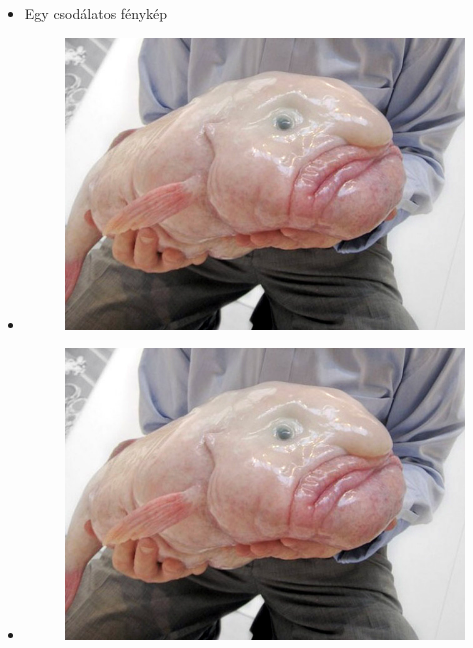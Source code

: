 \documentclass[aspectratio=169,12pt]{beamer}
\begin{document}
\begin{frame}
\end{frame}

\begin{frame}
	\begin{itemize}
		\item Egy csodálatos fénykép
		\item<1> 
		\begin{figure}
				\includegraphics[scale=0.3]{blob.jpg}
		\end{figure}				
		\item<2>
		\begin{figure}
				\includegraphics[scale=0.3]{blob.jpg}
		\end{figure}	
	\end{itemize}
\end{frame}
\end{document}
